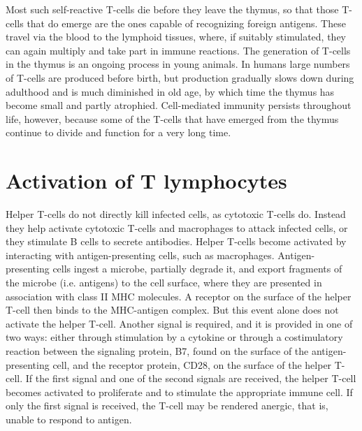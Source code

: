 Most such self-reactive T-cells die before they leave the thymus, so that those T-cells that do emerge are the ones capable of recognizing foreign antigens. These travel via the blood to the lymphoid tissues, where, if suitably stimulated, they can again multiply and take part in immune reactions. The generation of T-cells in the thymus is an ongoing process in young animals. In humans large numbers of T-cells are produced before birth, but production gradually slows down during adulthood and is much diminished in old age, by which time the thymus has become small and partly atrophied. Cell-mediated immunity persists throughout life, however, because some of the T-cells that have emerged from the thymus continue to divide and function for a very long time.

\section{Activation of T lymphocytes}
Helper T-cells do not directly kill infected cells, as cytotoxic T-cells do. Instead they help activate cytotoxic T-cells and macrophages to attack infected cells, or they stimulate B cells to secrete antibodies. Helper T-cells become activated by interacting with antigen-presenting cells, such as macrophages. Antigen-presenting cells ingest a microbe, partially degrade it, and export fragments of the microbe (i.e. antigens) to the cell surface, where they are presented in association with class II MHC molecules. A receptor on the surface of the helper T-cell then binds to the MHC-antigen complex. But this event alone does not activate the helper T-cell. Another signal is required, and it is provided in one of two ways: either through stimulation by a cytokine or through a costimulatory reaction between the signaling protein, B7, found on the surface of the antigen-presenting cell, and the receptor protein, CD28, on the surface of the helper T-cell. If the first signal and one of the second signals are received, the helper T-cell becomes activated to proliferate and to stimulate the appropriate immune cell. If only the first signal is received, the T-cell may be rendered anergic, that is, unable to respond to antigen.

